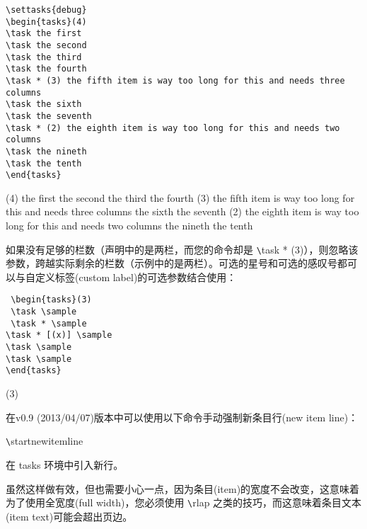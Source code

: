 \documentclass[a4paper,12pt,indent]{article}
\begin{document}
\begin{tcolorbox}[collower=black,colframe=Tasks,colback=white]
    \begin{lstlisting}
\settasks{debug}
\begin{tasks}(4)
\task the first
\task the second
\task the third
\task the fourth
\task * (3) the fifth item is way too long for this and needs three columns
\task the sixth
\task the seventh
\task * (2) the eighth item is way too long for this and needs two columns
\task the nineth
\task the tenth
\end{tasks}
    \end{lstlisting}
 \tcblower
{}
\begin{tasks}(4)
\task the first
\task the second
\task the third
\task the fourth
\task * (3) the fifth item is way too long for this and needs three columns
\task the sixth
\task the seventh
\task * (2) the eighth item is way too long for this and needs two columns
\task the nineth
\task the tenth
\end{tasks}
    \end{tcolorbox}

如果没有足够的栏数（声明中的是两栏，而您的命令却是  \verb|\|\textcolor{Tasks}{task * (3)}），则忽略该参数，跨越实际剩余的栏数（示例中的是两栏）。可选的星号和可选的感叹号都可以与自定义标签(custom label)的可选参数结合使用：


 \begin{tcolorbox}[collower=black,colframe=Tasks,colback=white]
 \begin{lstlisting}
 \begin{tasks}(3)
 \task \sample
 \task * \sample
\task * [(x)] \sample
\task \sample
\task \sample
\end{tasks}
 \end{lstlisting}
     \tcblower
     \begin{tasks}(3)
        \task \sample
        \task * \sample
       \task * [(x)] \sample
       \task \sample
       \task \sample
       \end{tasks}
        \end{tcolorbox}

在v0.9 (2013/04/07)版本中可以使用以下命令手动强制新条目行(new item line)：

\verb|\|\textcolor{Tasks}{startnewitemline}

在 tasks 环境中引入新行。

虽然这样做有效，但也需要小心一点，因为条目(item)的宽度不会改变，这意味着为了使用全宽度(full width)，您必须使用  \verb|\|\textcolor{Tasks}{rlap} 之类的技巧，而这意味着条目文本(item text)可能会超出页边。
\end{document}

